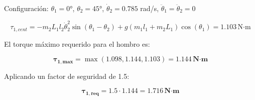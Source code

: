 Configuración: $\theta_1 = 0°$, $\theta_2 = 45°$, $\dot{\theta}_2 = 0.785$ rad/s, $\ddot{\theta}_1 = \ddot{\theta}_2 = 0$

\begin{equation}
\tau_{1,cent} = - m_2L_1l_2\dot{\theta}_2^2\sin(\theta_1 - \theta_2) + g(m_1l_1 + m_2L_1)\cos(\theta_1)
= 1.103 \, \text{N·m}
\end{equation}

El torque máximo requerido para el hombro es:

\begin{equation}
\mathbf{\tau_{1,max}} = \max(1.098, 1.144, 1.103) = \mathbf{1.144 \, \textbf{N·m} }
\end{equation}

Aplicando un factor de seguridad de 1.5:

\begin{equation}
\mathbf{\tau_{1,req}} = 1.5 \cdot 1.144 = \mathbf{1.716 \, \textbf{N·m} }
\end{equation}




